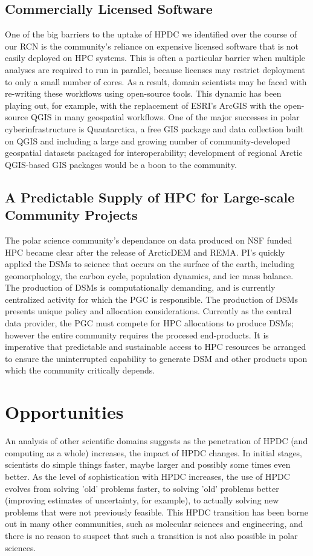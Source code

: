 \documentclass[10pt,letterpaper,draft]{article}
\begin{document}
\subsection*{Commercially Licensed Software}
One of the big barriers to the uptake of HPDC we identified over the course of our RCN is the community's reliance on expensive licensed software that is not easily deployed on HPC systems. This is often a particular barrier when multiple analyses are required to run in parallel, because licenses may restrict deployment to only a small number of cores. As a result, domain scientists may be faced with re-writing these workflows using open-source tools. This dynamic has been playing out, for example, with the replacement of ESRI's ArcGIS with the open-source QGIS in many geospatial workflows. One of the major successes in polar cyberinfrastructure is Quantarctica, a free GIS package and data collection built on QGIS and including a large and growing number of community-developed geospatial datasets packaged for interoperability; development of regional Arctic QGIS-based GIS packages would be a boon to the community.

\subsection*{A Predictable Supply of HPC for Large-scale Community Projects}
The polar science community's dependance on data produced on NSF funded HPC became clear after the release of ArcticDEM and REMA.  PI's quickly applied the DSMs to science that occurs on the surface of the earth, including geomorphology, the carbon cycle, population dynamics, and ice mass balance.  The production of DSMs is computationally demanding, and is currently centralized activity for which the PGC is responsible. The production of DSMs presents unique policy and allocation considerations.  Currently as the central data provider, the PGC must compete for HPC allocations to produce DSMs; however the entire community  requires the procesed end-products.  It is imperative that predictable and sustainable access to HPC resources be arranged to ensure the uninterrupted capability to generate DSM and other products upon which the community critically depends. 

\section*{Opportunities}
An analysis of other scientific domains suggests as the penetration of HPDC (and computing as a whole) increases, the impact of HPDC changes. In initial stages, scientists do simple things faster, maybe larger and possibly some times even better. As the level of sophistication with HPDC increases, the use of HPDC evolves from solving 'old' problems faster, to solving 'old' problems better (improving estimates of uncertainty, for example), to actually solving new problems that were not previously feasible. This HPDC transition has been borne out in many other communities, such as molecular sciences and engineering, and there is no reason to suspect that such a transition is not also possible in polar sciences. 
\end{document}
